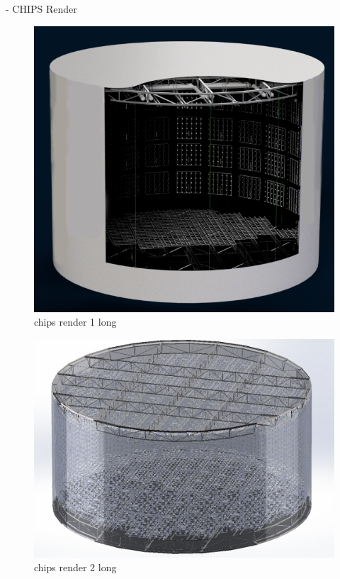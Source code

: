 - CHIPS Render
\begin{figure}
    \includegraphics[width=\textwidth]{diagrams/4-chips/chips_render_1.png}
    \caption[chips render 1 short]{chips render 1 long}
    \label{fig:chips_render_1}
\end{figure}
\begin{figure}
    \includegraphics[width=\textwidth]{diagrams/4-chips/chips_render_2.png}
    \caption[chips render 2 short]{chips render 2 long}
    \label{fig:chips_render_2}
\end{figure}
